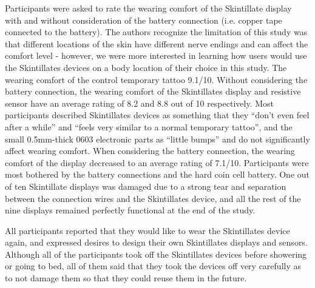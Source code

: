 \documentclass{sigchi}
\begin{document}
Participants were asked to rate the wearing comfort of the Skintillate display with and without consideration of the battery connection (i.e. copper tape connected to the battery). The authors recognize the limitation of this study was that different locations of the skin have different nerve endings and can affect the comfort level - however, we were more interested in learning how users would use the Skintillates devices on a body location of their choice in this study. The wearing comfort of the control temporary tattoo 9.1/10. Without considering the battery connection, the wearing comfort of the Skintillates display and resistive sensor have an average rating of 8.2 and 8.8 out of 10 respectively. Most participants described Skintillates devices as something that they ``don't even feel after a while'' and ``feels very similar to a normal temporary tattoo'', and the small 0.5mm-thick 0603 electronic parts as ``little bumps'' and do not significantly affect wearing comfort. When considering the battery connection, the wearing comfort of the display decreased to an average rating of 7.1/10. Participants were most bothered by the battery connections and the hard coin cell battery. One out of ten Skintillate displays was damaged due to a strong tear and separation between the connection wires and the Skintillates device, and all the rest of the nine displays remained perfectly functional at the end of the study.

All participants reported that they would like to wear the Skintillates device again, and expressed desires to design their own Skintillates displays and sensors. Although all of the participants took off the Skintillates devices before showering or going to bed, all of them said that they took the devices off very carefully as to not damage them so that they could reuse them in the future. 
\end{document}
